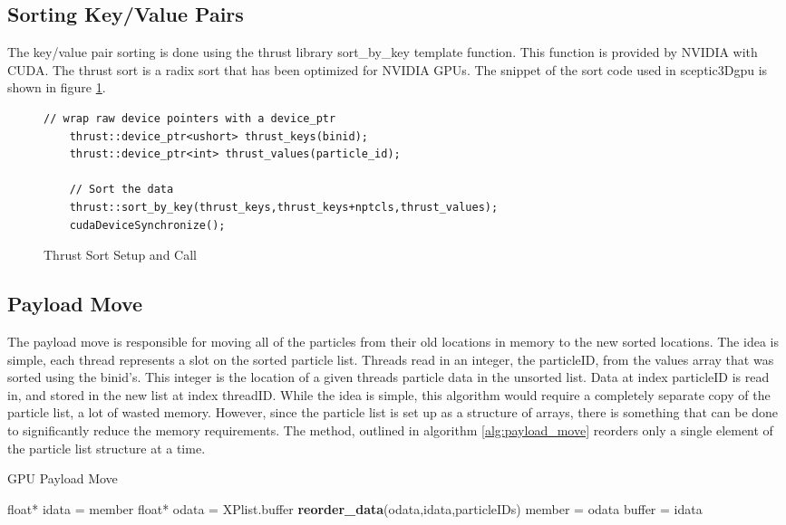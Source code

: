 		\subsection{Sorting Key/Value Pairs}
		The key/value pair sorting is done using the thrust library sort\_by\_key template function. This function is provided by NVIDIA with CUDA. The thrust sort is a radix sort that has been optimized for NVIDIA GPUs\cite{NVIDIACorporation2011a}. The snippet of the sort code used in sceptic3Dgpu is shown in figure \ref{fig:thrust_sort}.

\begin{figure}
\begin{lstlisting}[frame=single]
	// wrap raw device pointers with a device_ptr
	thrust::device_ptr<ushort> thrust_keys(binid);
	thrust::device_ptr<int> thrust_values(particle_id);

	// Sort the data
	thrust::sort_by_key(thrust_keys,thrust_keys+nptcls,thrust_values);
	cudaDeviceSynchronize();
\end{lstlisting}
\vspace{-0.4in}
\caption{Thrust Sort Setup and Call}
\label{fig:thrust_sort}
\end{figure}


		\subsection{Payload Move}
		The payload move is responsible for moving all of the particles from their old locations in memory to the new sorted locations. The idea is simple, each thread represents a slot on the sorted particle list. Threads read in an integer, the particleID, from the values array that was sorted using the binid's. This integer is the location of a given threads particle data in the unsorted list. Data at index particleID is read in, and stored in the new list at index threadID. While the idea is simple, this algorithm would require a completely separate copy of the particle list, a lot of wasted memory. However, since the particle list is set up as a structure of arrays, there is something that can be done to significantly reduce the memory requirements. The method, outlined in algorithm \ref{alg:payload_move} reorders only a single element of the particle list structure at a time. 

\begin{algorithm}
	\caption{GPU Payload Move}
	\label{alg:payload_move}
	\begin{algorithmic}
		\STATE float* idata = member
		\STATE float* odata = XPlist.buffer
		\STATE \textbf{reorder\_data}(odata,idata,particleIDs)
		\STATE member = odata
		\STATE buffer = idata
		\ENDFOR
	\end{algorithmic}
\end{algorithm}
  		
